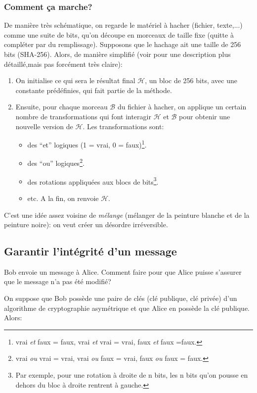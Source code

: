 \subsubsection{Comment ça marche?}
De manière très schématique, on regarde le matériel à hacher (fichier,
texte,...) comme une suite de bits, qu'on découpe en morceaux de
taille fixe (quitte à compléter par du remplissage). Supposons que le
hachage ait une taille de 256 bits (SHA-256). Alors, de manière
simplifié (voir \cite{sha2} pour une description plus détaillé,mais
pas forcément très claire):
\begin{enumerate}
\item On initialise ce qui sera le résultat final $\mathcal{H}$, un
  bloc de 256 bits,  avec une constante
  prédéfinies, qui fait partie de la méthode.
\item Ensuite, pour chaque morceau $\mathcal{B}$ du fichier à hacher,
  on applique un 
  certain nombre de transformations qui font interagir  $\mathcal{H}$
  et $\mathcal{B}$  pour obtenir une nouvelle version de
  $\mathcal{H}$.
  Les transformations sont:
  \begin{itemize}
  \item des ``et'' logiques (1 = vrai, 0 = faux)\footnote{vrai
    \emph{et} faux = faux, vrai  \emph{et} vrai = vrai, faux
    \emph{et} faux =faux.}.
  \item des ``ou'' logiques\footnote{vrai  \emph{ou} vrai = vrai, vrai
    \emph{ou} faux = vrai, faux \emph{ou} faux = faux.}.
  \item des rotations appliquées aux blocs de bits\footnote{Par
    exemple, pour une rotation à droite de n bits, les n bits qu'on
    pousse en dehors du bloc à droite rentrent à gauche.}.
  \item etc. A la fin, on renvoie $\mathcal{H}$.
  \end{itemize}
\end{enumerate}
C'est une idée assez voisine de \emph{mélange} (mélanger de la
peinture blanche et de la peinture noire): on veut créer un désordre
irréversible. 

    
\subsection{Garantir l'intégrité d'un message}
Bob envoie un message à Alice. Comment faire pour que Alice puisse
s'assurer que le message n'a pas été modifié?

On suppose que Bob possède une paire de clés (clé publique,
clé privée) d'un algorithme de cryptographie asymétrique et que Alice
en possède la clé publique. Alors:


